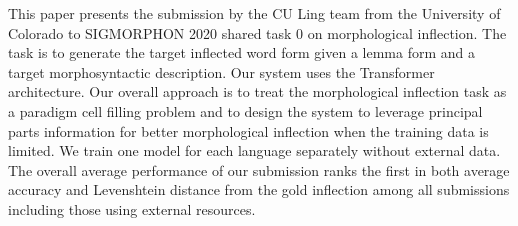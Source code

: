 This paper presents the submission by the CU Ling team from the University of Colorado to SIGMORPHON 2020 shared task 0 on morphological inflection. The task is to generate the target inflected word form given a lemma form and a target morphosyntactic description. Our system uses the Transformer architecture.  Our overall approach is to treat the morphological inflection task as a paradigm cell filling problem and to design the system to leverage principal parts information for better morphological inflection when the training data is limited. We train one model for each language separately without external data. The overall average performance of our submission ranks the first in both average accuracy and Levenshtein distance from the gold inflection among all submissions including those using external resources.
